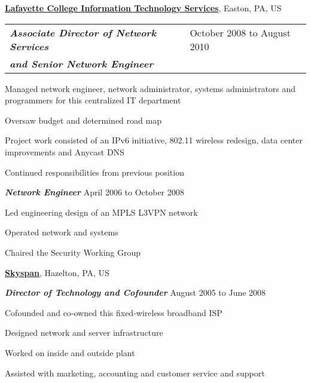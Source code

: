 \documentclass[10pt]{article}
\newenvironment{outerlist}[1][\enskip\textbullet]%
        {\begin{itemize}[#1]}{\end{itemize}%
         \vspace{-.6\baselineskip}}
\newenvironment{innerlist}[1][\enskip\textbullet]%
        {\begin{compactitem}[#1]}{\end{compactitem}}
\newcommand{\blankline}{\quad\pagebreak[2]}
\begin{document}
\href{http://its.lafayette.edu/}{\textbf{Lafayette College Information Technology Services}},
Easton, PA, US
\begin{outerlist}
\item[]
  \newlength{\rcoltitlelength}\setlength{\rcoltitlelength}{2.16in}
  \begin{tabular}[t]{@{}p{\textwidth-\rcoltitlelength} p{\rcoltitlelength}}
    \textit{\textbf{Associate Director of Network Services }} &
    October 2008 to August 2010 \\
    \textit{\textbf{and Senior Network Engineer}} & \\
  \end{tabular}
  \begin{innerlist}
  \item Managed network engineer, network administrator, systems administrators and programmers for this centralized IT department
  \item Oversaw budget and determined road map
  \item Project work consisted of an IPv6 initiative, 802.11 wireless redesign, data center improvements and Anycast DNS
  \item Continued responsibilities from previous position
  \end{innerlist}

\item[] \textit{\textbf{Network Engineer}}
  \hfill April 2006 to October 2008
  \begin{innerlist}
  \item Led engineering design of an MPLS L3VPN network
  \item Operated network and systems
  \item Chaired the Security Working Group
  \end{innerlist}
\end{outerlist}

\blankline

\href{http://www.skyspanonline.com/}{\textbf{Skyspan}},
Hazelton, PA, US
\begin{outerlist}
\item[] \textit{\textbf{Director of Technology and Cofounder}}
  \hfill August 2005 to June 2008
  \begin{innerlist}
  \item Cofounded and co-owned this fixed-wireless broadband ISP
  \item Designed network and server infrastructure
  \item Worked on inside and outside plant
  \item Assisted with marketing, accounting and customer service and support
  \end{innerlist}
\end{outerlist}
\end{document}
